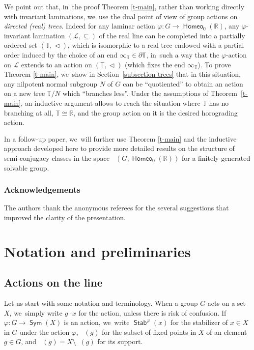 \documentclass[JEP,XML,SOM,Unicode,NoFloatCountersInSection,published]{cedram}
\theoremstyle{definition}
\DeclareMathOperator{\Bij}{\mathsf{Sym}}
\DeclareMathOperator{\fixphi}{\mathsf{Fix}^\varphi}
\DeclareMathOperator{\homeo}{\mathsf{Homeo}}
\DeclareMathOperator{\Homirr}{\mathsf{Hom}_{\mathrm{irr}}}
\DeclareMathOperator{\stab}{\mathsf{Stab}}
\DeclareMathOperator{\suppphi}{\mathsf{Supp}^\varphi}
\newcommand{\R}{\mathbb{R}}
\newcommand{\Tbb}{\mathbb T}
\newcommand{\Lcal}{\mathcal{L}}
\newcommand{\treeorder}{\mathrel{\triangleleft}}
\begin{document}
We point out that, in~the proof Theorem \ref{t-main}, rather than working directly with invariant laminations, we~use the dual point of view of group actions on \emph{directed (real) trees}. Indeed for any laminar action $\varphi\colon G\to \homeo_0(\R)$, any $\varphi$-invariant lamination $(\Lcal, \subseteq)$ of the real line can be completed into a partially ordered set $(\Tbb, \treeorder)$, which is isomorphic to a real tree endowed with a partial order induced by the choice of an end $\infty_\Tbb \in \partial \Tbb$, in~such a way that the $\varphi$-action on $\mathcal L$ extends to an action on $(\Tbb,\treeorder)$ (which fixes the end $\infty_\Tbb$). To prove Theorem \ref{t-main}, we~show in Section~\ref{subsection trees} that in this situation, any nilpotent normal subgroup $N$ of $G$ can be ``quotiented'' to obtain an action on a new tree $\Tbb/N$ which ``branches less''. Under the assumptions of Theorem~\ref{t-main}, an inductive argument allows to reach the situation where $\Tbb$ has no branching at all, \ie $\Tbb\cong \R$, and the group action on it is the desired horograding action.

In a follow-up paper, we~will further use Theorem \ref{t-main} and the inductive approach developed here to provide more detailed results on the structure of semi-conjugacy classes in the space $\Homirr(G, \homeo_0(\R))$ for a finitely generated solvable group.

\subsubsection*{Acknowledgements}
The authors thank the anonymous referees for the several suggestions that improved the clarity of the presentation.

\section{Notation and preliminaries}
\subsection{Actions on the line}\label{sc.preliminary-actions}
Let us start with some notation and terminology. When a group $G$ acts on a set $X$, we~simply write $g\cdot x$ for the action, unless there is risk of confusion. If~$\varphi\colon G\to \Bij(X)$ is an action, we~write $\stab^\varphi(x)$ for the stabilizer of $x\in X$ in $G$ under the action $\varphi$, $\fixphi(g)$ for the subset of fixed points in $X$ of an element $g\in G$, and $\suppphi(g)=X\setminus \fixphi(g)$ for its support.
\end{document}
